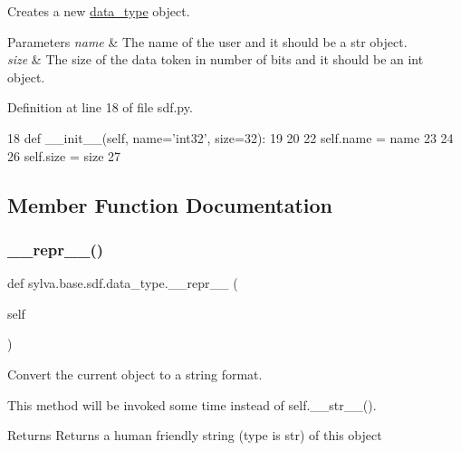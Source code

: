 Creates a new \hyperlink{classsylva_1_1base_1_1sdf_1_1data__type}{data\+\_\+type} object. 


\begin{DoxyParams}{Parameters}
{\em name} & The name of the user and it should be a str object. \\
\hline
{\em size} & The size of the data token in number of bits and it should be an int object. \\
\hline
\end{DoxyParams}


Definition at line 18 of file sdf.\+py.


\begin{DoxyCode}
18         \textcolor{keyword}{def }\_\_init\_\_(self, name='int32', size=32):
19 
20             
22             self.name = name
23 
24             
26             self.size = size
27 
\end{DoxyCode}


\subsection{Member Function Documentation}
\mbox{\label{classsylva_1_1base_1_1sdf_1_1data__type_ab7aca19176b5b02f9cb14295269d9b43}} 
\subsubsection{\texorpdfstring{\+\_\+\+\_\+repr\+\_\+\+\_\+()}{\_\_repr\_\_()}}
{\footnotesize\ttfamily def sylva.\+base.\+sdf.\+data\+\_\+type.\+\_\+\+\_\+repr\+\_\+\+\_\+ (\begin{DoxyParamCaption}\item[{}]{self }\end{DoxyParamCaption})}



Convert the current object to a string format. 

This method will be invoked some time instead of self.\+\_\+\+\_\+str\+\_\+\+\_\+(). \begin{DoxyReturn}{Returns}
Returns a human friendly string (type is str) of this object 
\end{DoxyReturn}


